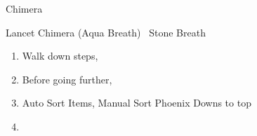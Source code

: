 \begin{battle}{Chimera}
	\begin{itemize}
		\kimahrif Lancet Chimera (Aqua Breath)
		\kimahrif \od\ Stone Breath
	\end{itemize}
\end{battle}
\begin{enumerate}[resume]
	\item Walk down steps, \cs[1:30]
	\item Before going further, 
	\item Auto Sort Items, Manual Sort Phoenix Downs to top
	\item \formation{\tidus}{\auron}{\kimahri}
\end{enumerate}